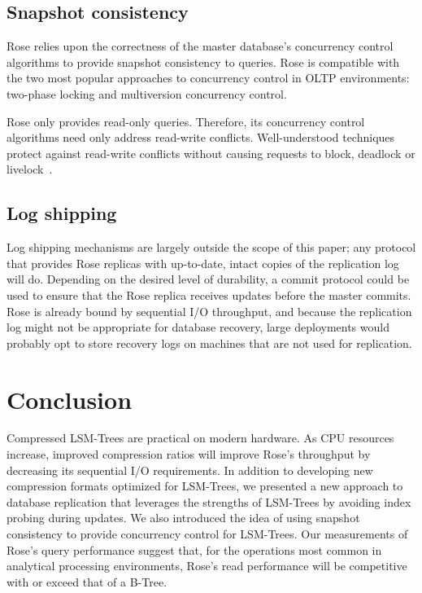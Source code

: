 \documentclass{vldb}
\newcommand{\rows}{Rose\xspace}
\newcommand{\rowss}{Rose's\xspace}
\begin{document}

\subsection{Snapshot consistency}

\rows relies upon the correctness of the master database's concurrency
control algorithms to provide snapshot consistency to queries.  \rows
is compatible with the two most popular approaches to concurrency
control in OLTP environments: two-phase locking and multiversion concurrency control.

\rows only provides read-only queries.  Therefore, its concurrency
control algorithms need only address read-write conflicts.
Well-understood techniques protect against read-write conflicts
without causing requests to block, deadlock or
livelock~\cite{concurrencyControl}.

\subsection{Log shipping}

Log shipping mechanisms are largely outside the scope of this paper;
any protocol that provides \rows replicas with up-to-date, intact
copies of the replication log will do.  Depending on the desired level
of durability, a commit protocol could be used to ensure that the
\rows replica receives updates before the master commits.
\rows is already bound by sequential I/O throughput, and because the
replication log might not be appropriate for database recovery, large
deployments would probably opt to store recovery logs on machines
that are not used for replication.

\section{Conclusion}

Compressed LSM-Trees are practical on modern hardware.  As CPU
resources increase, improved compression ratios will improve \rowss
throughput by decreasing its sequential I/O requirements.  In addition
to developing new compression formats optimized for LSM-Trees, we presented a new approach to
database replication that leverages the strengths of LSM-Trees by
avoiding index probing during updates.  We also introduced the idea of
using snapshot consistency to provide concurrency control for
LSM-Trees.  Our measurements of \rowss query performance suggest that,
for the operations most common in analytical processing environments,
\rowss read performance will be competitive with or exceed that of a
B-Tree.
\end{document}
